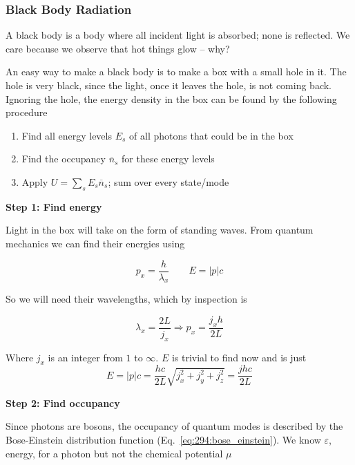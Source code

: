 \documentclass[10pt]{article}
\begin{document}
\subsubsection{Black Body Radiation}
A black body is a body where all incident light is absorbed; none is reflected. 
We care because we observe that hot things glow -- why?

An easy way to make a black body is to make a box with a small hole in it. 
The hole is very black, since the light, once it leaves the hole, is not coming back.
Ignoring the hole, the energy density in the box can be found by the following procedure

\begin{enumerate}
	\item Find all energy levels $ E_s $  of all photons that could be in the box
	\item Find the occupancy $ \overline{n}_s $ for these energy levels
	\item Apply $ U = \sum_s E_s \overline{n}_s $; sum over every state/mode
\end{enumerate}


\textbf{Step 1: Find energy} 

Light in the box will take on the form of standing waves.
From quantum mechanics we can find their energies using

\begin{equation}
	p_x = \frac{h}{\lambda_x} \qquad E = |p| c
\end{equation}

So we will need their wavelengths, which by inspection is

\begin{equation}
	\lambda_x = \frac{2L}{j_x} \Rightarrow p_x = \frac{j_x h}{2L}
\end{equation}

Where $ j_x $  is an integer from $ 1  $  to $ \infty $.
$ E $ is trivial to find now and is just
\begin{equation}
	E = |p|c = \frac{hc}{2L} \sqrt{j_x^2 + j_y^2+ j_z^2}  = \frac{jhc}{2L}
\end{equation}


\textbf{Step 2: Find occupancy} 

Since photons are bosons, the occupancy of quantum modes is described by the Bose-Einstein distribution function (Eq.~\ref{eq:294:bose_einstein}).
We know $ \varepsilon $, energy, for a photon but not the chemical potential $ \mu $ 
\end{document}
